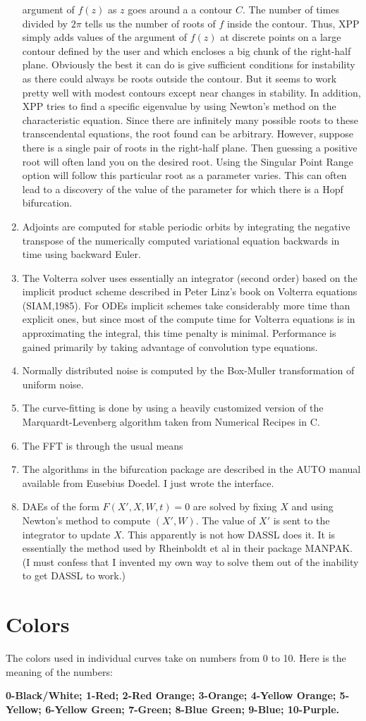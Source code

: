 \documentclass{article}
\begin{document}
\begin{enumerate}
argument of $f(z)$ as $z$ goes around a a contour $C.$ The number of
times divided by $2\pi$ tells us the number of roots of $f$ inside the
contour. Thus, XPP simply adds values of the argument of $f(z)$ at
discrete points on a large contour defined by the user and which
encloses a big chunk of the right-half plane.  Obviously the best it
can do is give sufficient conditions for instability as there could
always be roots outside the contour. But it seems to work pretty well
with modest contours except near changes in stability. In addition,
XPP tries to find a specific eigenvalue by using Newton's method on
the characteristic equation. Since there are infinitely many possible
roots to these transcendental equations, the root found can be
arbitrary. However, suppose there is a single pair of roots in the
right-half plane. Then guessing a positive root will often land you on
the desired root. Using the Singular Point Range option will follow
this particular root as a parameter varies. This can often lead to a
discovery of the value of the parameter for which there is a Hopf
bifurcation.
   

\item Adjoints are computed for stable periodic
 orbits by integrating the negative transpose of the numerically computed
 variational equation backwards in time using backward Euler.

\item The Volterra solver uses essentially an integrator (second order)
based on the implicit product scheme described in Peter Linz's book on
Volterra equations (SIAM,1985). For ODEs implicit schemes take
considerably more time than explicit ones, but since most of the
compute time for Volterra equations is in approximating the integral,
this time penalty is minimal.  Performance is gained primarily by
taking advantage of convolution type equations.

\item Normally distributed noise is computed by the Box-Muller
transformation of uniform noise.
\item The curve-fitting is done by using a heavily customized version
of the Marquardt-Levenberg algorithm taken from Numerical Recipes in
C. 
\item The FFT is through the usual means
\item The algorithms in the bifurcation package are described in the
AUTO manual available from Eusebius Doedel.  I just wrote the
interface.
\item DAEs of the form $F(X',X,W,t)=0$ are solved by fixing $X$ and
using Newton's method to compute $(X',W)$.  The value of $X'$ is sent
to the integrator to update $X.$  This apparently is not how DASSL
does it.  It is essentially the method used by Rheinboldt et al in
their package MANPAK. (I must confess that I invented my own way to
solve them out of the inability to get DASSL to work.)
\end{enumerate}
 
\section{Colors}
The colors used in individual curves take on numbers from 0 to 10. Here is
the meaning of the numbers:

{\bf 0-Black/White; 1-Red; 2-Red Orange; 3-Orange;
4-Yellow Orange; 5-Yellow; 6-Yellow Green; 7-Green; 8-Blue Green; 9-Blue;
10-Purple.}
\end{document}
